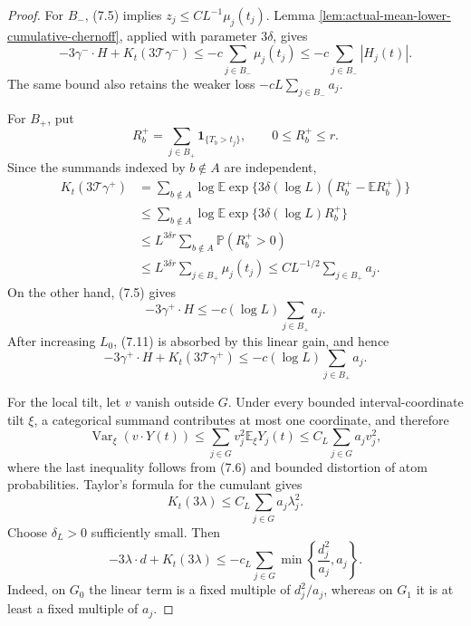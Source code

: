 \documentclass[11pt]{article}
\theoremstyle{remark}
\newcommand{\Pp}{\mathbb P}
\newcommand{\Ee}{\mathbb E}
\newcommand{\one}{\mathbf 1}
\newcommand{\Var}{\operatorname{Var}}
\begin{document}
\begin{proof}
For $B_-$, (7.5) implies $z_j\le C L^{-1}\mu_j(t_j)$.  Lemma
\ref{lem:actual-mean-lower-cumulative-chernoff}, applied with parameter
$3\delta$, gives
\[
        -3\gamma^-\cdot H+K_t(3\mathcal T\gamma^-)
        \le-c\sum_{j\in B_-}\mu_j(t_j)
        \le-c\sum_{j\in B_-}|H_j(t)|.
        \tag{7.10}
\]
The same bound also retains the weaker loss
$-cL\sum_{j\in B_-}a_j$.

For $B_+$, put
\[
        R_b^+=\sum_{j\in B_+}\one_{\{T_b>t_j\}},
        \qquad 0\le R_b^+\le r.
\]
Since the summands indexed by $b\notin A$ are independent,
\[
\begin{aligned}
K_t(3\mathcal T\gamma^+)
&=\sum_{b\notin A}
 \log\Ee\exp\{3\delta(\log L)(R_b^+-\Ee R_b^+)\}\\
&\le \sum_{b\notin A}
 \log\Ee\exp\{3\delta(\log L)R_b^+\}\\
&\le L^{3\delta r}\sum_{b\notin A}\Pp(R_b^+>0)\\
&\le L^{3\delta r}\sum_{j\in B_+}\mu_j(t_j)
 \le C L^{-1/2}\sum_{j\in B_+}a_j.
\end{aligned}
\tag{7.11}
\]
On the other hand, (7.5) gives
\[
        -3\gamma^+\cdot H
        \le-c(\log L)\sum_{j\in B_+}a_j.
\]
After increasing $L_0$, (7.11) is absorbed by this linear gain, and hence
\[
        -3\gamma^+\cdot H+K_t(3\mathcal T\gamma^+)
        \le-c(\log L)\sum_{j\in B_+}a_j.
        \tag{7.12}
\]

For the local tilt, let $v$ vanish outside $G$.  Under every bounded
interval-coordinate tilt $\xi$, a categorical summand contributes at most one
coordinate, and therefore
\[
        \Var_\xi(v\cdot Y(t))
        \le\sum_{j\in G}v_j^2\Ee_\xi Y_j(t)
        \le C_L\sum_{j\in G}a_jv_j^2,
        \tag{7.13}
\]
where the last inequality follows from (7.6) and bounded distortion of atom
probabilities.  Taylor's formula for the cumulant gives
\[
        K_t(3\lambda)\le C_L\sum_{j\in G}a_j\lambda_j^2.
\]
Choose $\delta_L>0$ sufficiently small.  Then
\[
        -3\lambda\cdot d+K_t(3\lambda)
        \le-c_L\sum_{j\in G}
        \min\left\{\frac{d_j^2}{a_j},a_j\right\}.
        \tag{7.14}
\]
Indeed, on $G_0$ the linear term is a fixed multiple of $d_j^2/a_j$,
whereas on $G_1$ it is at least a fixed multiple of $a_j$.


\end{proof}
\end{document}

